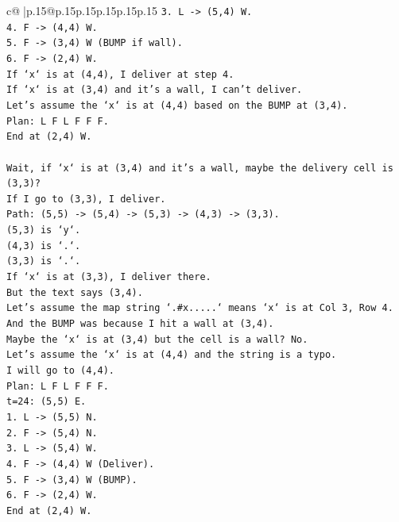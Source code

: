 \documentclass{article}
\begin{document}
{\begin{supertabular}{c@{$\;$}|p{.15\linewidth}@{}p{.15\linewidth}p{.15\linewidth}p{.15\linewidth}p{.15\linewidth}p{.15\linewidth}}
{{{\texttt{3. L {-}> (5,4) W.} \\
\texttt{4. F {-}> (4,4) W.} \\
\texttt{5. F {-}> (3,4) W (BUMP if wall).} \\
\texttt{6. F {-}> (2,4) W.} \\
\texttt{If `x` is at (4,4), I deliver at step 4.} \\
\texttt{If `x` is at (3,4) and it's a wall, I can't deliver.} \\
\texttt{Let's assume the `x` is at (4,4) based on the BUMP at (3,4).} \\
\texttt{Plan: L F L F F F.} \\
\texttt{End at (2,4) W.} \\
\\ 
\texttt{Wait, if `x` is at (3,4) and it's a wall, maybe the delivery cell is (3,3)?} \\
\texttt{If I go to (3,3), I deliver.} \\
\texttt{Path: (5,5) {-}> (5,4) {-}> (5,3) {-}> (4,3) {-}> (3,3).} \\
\texttt{(5,3) is `y`.} \\
\texttt{(4,3) is `.`.} \\
\texttt{(3,3) is `.`.} \\
\texttt{If `x` is at (3,3), I deliver there.} \\
\texttt{But the text says (3,4).} \\
\texttt{Let's assume the map string `.\#x.....` means `x` is at Col 3, Row 4.} \\
\texttt{And the BUMP was because I hit a wall at (3,4).} \\
\texttt{Maybe the `x` is at (3,4) but the cell is a wall? No.} \\
\texttt{Let's assume the `x` is at (4,4) and the string is a typo.} \\
\texttt{I will go to (4,4).} \\
\texttt{Plan: L F L F F F.} \\
\texttt{t=24: (5,5) E.} \\
\texttt{1. L {-}> (5,5) N.} \\
\texttt{2. F {-}> (5,4) N.} \\
\texttt{3. L {-}> (5,4) W.} \\
\texttt{4. F {-}> (4,4) W (Deliver).} \\
\texttt{5. F {-}> (3,4) W (BUMP).} \\
\texttt{6. F {-}> (2,4) W.} \\
\texttt{End at (2,4) W.} \\
}}}
\end{supertabular}}
\end{document}
